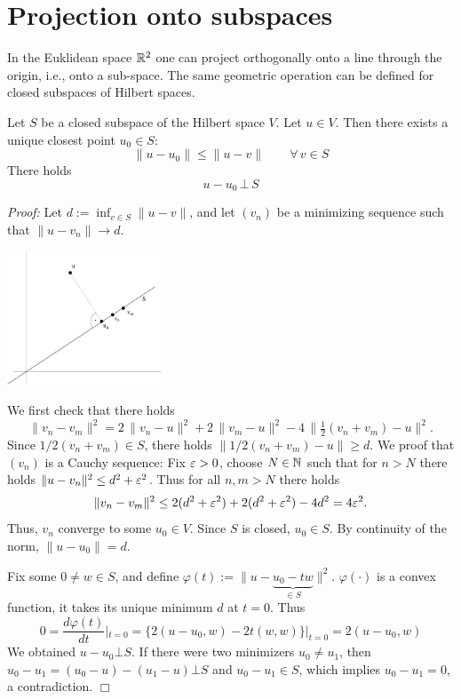 \section{Projection onto subspaces}

In the Euklidean space ${\mathbb R}^2$ one can project orthogonally onto a
line through the origin, i.e., onto a sub-space. The same geometric
operation can be defined for closed subspaces of Hilbert spaces.

\begin{theorem} \label{theo_proj}
Let $S$ be a closed subspace of the Hilbert space $V$. 
Let $u \in V$. Then there exists a unique closest point $u_0 \in S$:
$$
\| u - u_0 \| \leq \| u - v \| \qquad \forall \, v \in S
$$
There holds
$$
u - u_0 \, \bot \, S
$$
\end{theorem}
\noindent
{\em Proof:} Let $d := \inf_{v \in S} \| u - v\|$, and let $(v_n)$ be
a minimizing sequence such that $\| u - v_n \| \rightarrow d$.

\begin{center}
\includegraphics[height=4cm]{pictures/project}
\end{center}


We first check that there holds
$$
\| v_n - v_m \|^2 = 2 \, \| v_n - u \|^2 + 2 \, \| v_m - u \|^2 - 4 \,  \| \tfrac{1}{2}(v_n+v_m) - u \|^2.
$$
Since $1/2 (v_n+v_m) \in S$, there holds $\| 1/2 (v_n+v_m) - u \| \geq d$.
We proof that $(v_n)$ is a Cauchy sequence:
Fix $\varepsilon > 0$, choose $N \in {\mathbb N}$ such that for $n > N$ there holds
$\| u - v_n \|^2 \leq d^2 + \varepsilon^2$. Thus for all $n,m > N$ there holds
$$
\| v_n - v_m \|^2 \leq 2 (d^2+\varepsilon^2) + 2 (d^2 + \varepsilon^2) - 4 d^2 = 4 \varepsilon^2.
$$ 
Thus, $v_n$ converge to some $u_0 \in V$. Since $S$ is closed, $u_0 \in S$.
By continuity of the norm, $\| u - u_0 \| = d$.

\medskip
Fix some $0 \neq w \in S$, and define $\varphi(t) := \| u - \underbrace{u_0 - t w}_{\in S} \|^2$.
$\varphi(\cdot)$ is a convex function, it takes its unique minimum $d$ at $t=0$. Thus
$$
0 = \frac{d \varphi(t)}{dt}|_{t=0} = \{ 2 (u-u_0, w) - 2 t (w,w) \} |_{t=0} = 
   2 (u-u_0,w)
$$ 
We obtained $u-u_0 \bot S$. If there were two minimizers $u_0 \neq u_1$, 
then $u_0-u_1 = (u_0-u) - (u_1-u) \bot S$ and $u_0-u_1 \in S$, which implies
$u_0-u_1 = 0$, a contradiction.
\hfill $\Box$

